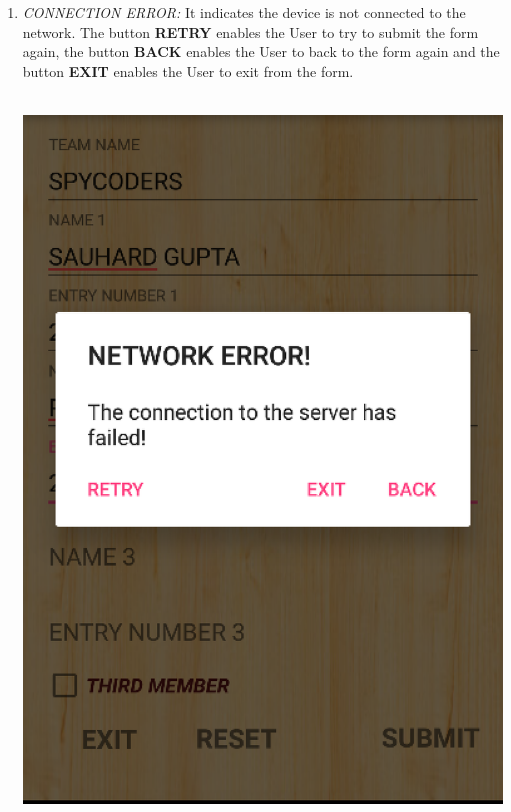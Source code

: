 \documentclass[12pt]{article}
\begin{document}
\begin{itemize}
\begin{enumerate}
\begin{enumerate}
            
            
            \item \textit{CONNECTION ERROR:} It indicates the device is not connected to the network. The button \textbf{RETRY} enables the User to try to submit the form again, the button \textbf{BACK} enables the User to back to the form again and the button \textbf{EXIT} enables the User to exit from the form.
            \\
            \\
            \begin{minipage}{\linewidth}
	        \centering
	        \includegraphics[scale=.7]{CONNECTION_FAILED.png}
            \end{minipage}
            \\
            \\
            \\
            \\
            

\end{enumerate}
\end{enumerate}
\end{itemize}
\end{document}
